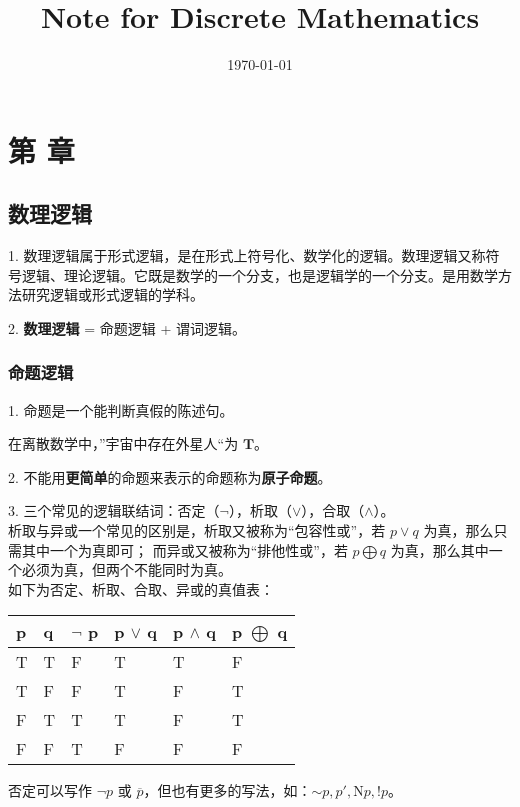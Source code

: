 \documentclass[normal,cyan]{elegantnote}
\title{Note for Discrete Mathematics}
\date{\today}
\institute{\href{http://leadedglass.site}{my blog}}
\newcommand{\roma}[1]{\uppercase\expandafter{\romannumeral#1}}
\begin{document}
\maketitle
\tableofcontents
\newpage

\section{第 \roma{1} 章}
\subsection{数理逻辑}

1. 数理逻辑属于形式逻辑，是在形式上符号化、数学化的逻辑。数理逻辑又称符号逻辑、理论逻辑。它既是数学的一个分支，也是逻辑学的一个分支。是用数学方法研究逻辑或形式逻辑的学科。

2. \textbf{数理逻辑} = 命题逻辑 + 谓词逻辑。

\subsubsection{命题逻辑}
1. 命题是一个能判断真假的陈述句。

\begin{note}
    在离散数学中，”宇宙中存在外星人“为 $\textbf{T}$。
\end{note}

2. 不能用\textbf{更简单}的命题来表示的命题称为\textbf{原子命题}。

3. 三个常见的逻辑联结词：否定（$\neg$），析取（$\vee$），合取（$\wedge$）。
\\
    析取与异或一个常见的区别是，析取又被称为“包容性或”，若 $p \vee q$ 为真，那么只需其中一个为真即可；
而异或又被称为“排他性或”，若 $p \bigoplus q$ 为真，那么其中一个必须为真，但两个不能同时为真。
\\
    如下为否定、析取、合取、异或的真值表：

\begin{table}[htbp]\centering
    \begin{tabular}{|l|l|l|l|l|l|}
    \hline
    p & q & $\neg$ p & p $\vee$ q & p $\wedge$ q & p $\bigoplus$ q \\ \hline
    T & T & F             & T          & T            & F               \\ \hline
    T & F & F             & T          & F            & T               \\ \hline
    F & T & T             & T          & F            & T               \\ \hline
    F & F & T             & F          & F            & F               \\ \hline
    \end{tabular}
    \end{table}
否定可以写作 $\neg p$ 或 $\overline{p}$，但也有更多的写法，如：$\sim p,p',\mathrm{N}p,!p$。
\end{document}
